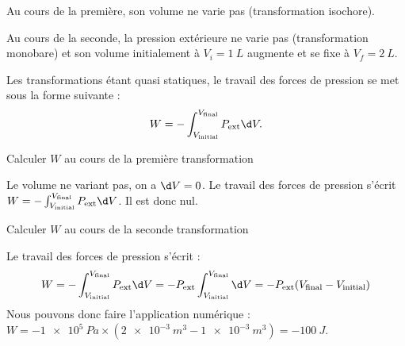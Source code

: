 Au cours de la première, son volume ne varie pas (transformation isochore).

Au cours de la seconde, la pression extérieure ne varie pas (transformation monobare) et son volume initialement à $V_i=\SI{1}{L}$ augmente et se fixe à $V_f= \SI{2}{L}$.

Les transformations étant quasi statiques, le travail des forces de pression se met sous la forme suivante : 
\[
W= -\int_{V_\text{initial}}^{V_\text{final}} P_{\text{ext}} \d V.
\]

\debutEntrainement


\begin{enonce}
	Calculer $W$ au cours de la première transformation 
\end{enonce}


\begin{corrige}
	Le volume ne variant pas, on a $\d V=0$. Le travail des forces de pression s'écrit $W=- \int_{V_\text{initial}}^{V_\text{final}} P_{\text{ext}} \d V$. Il est donc nul.
\end{corrige}



\begin{enonce}
	Calculer $W$ au cours de la seconde transformation 
\end{enonce}


\begin{corrige}
	Le travail des forces de pression s'écrit : 
	$$W=- \int_{V_\text{initial}}^{V_\text{final}} P_{\text{ext}} \d V= -P_{\text{ext}} \int_{V_\text{initial}}^{V_\text{final}} \d V = -P_{\text{ext}} (V_\text{final}-V_\text{initial})$$
	Nous pouvons donc faire l'application numérique : $W=- \SI{1e5}{Pa} \times (\SI{2e-3}{m^3}-\SI{1e-3}{m^3})= \SI{-100}{J}$.
\end{corrige}



